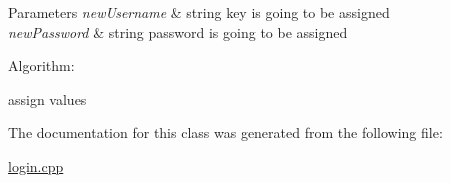 \begin{DoxyParams}{Parameters}
{\em new\-Username} & string key is going to be assigned \\
\hline
{\em new\-Password} & string password is going to be assigned\\
\hline
\end{DoxyParams}
Algorithm\-:
\begin{DoxyItemize}
\item assign values 
\end{DoxyItemize}

The documentation for this class was generated from the following file\-:\begin{DoxyCompactItemize}
\item 
\hyperlink{login_8cpp}{login.\-cpp}\end{DoxyCompactItemize}
